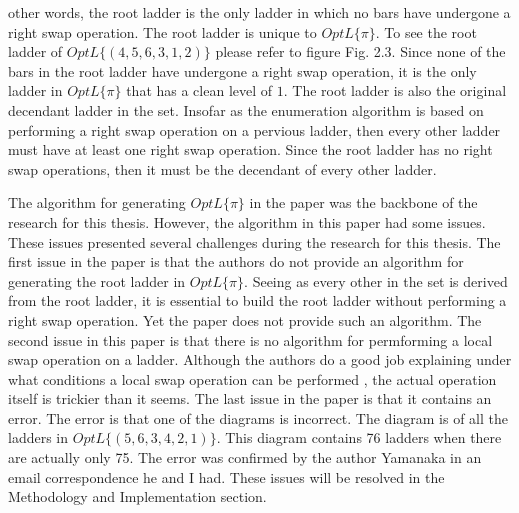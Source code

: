 other words, the root ladder is the only ladder in which no bars have undergone 
a right swap operation. The root ladder is unique to $OptL\{\pi\}$. To see the root ladder 
of $OptL\{(4,5,6,3,1,2)\}$ please refer to figure Fig. 2.3. Since none of
the bars in the root ladder have undergone a right swap operation, it is the only 
ladder in $OptL\{\pi\}$ that has a clean level of $1$. The root ladder is
also the original decendant ladder in the set. Insofar as the enumeration algorithm 
is based on performing a right swap operation on a pervious ladder, then every other 
ladder must have at least one right swap operation. Since the root ladder has
no right swap operations, then it must be the decendant of every other ladder.\par 
The algorithm for generating $OptL\{\pi\}$ in the paper was the backbone 
of the research for this thesis. However, the algorithm in this paper had some 
issues. These issues presented several challenges during the research for this thesis.
The first issue in the paper is that the authors do not provide an algorithm for
generating the root ladder in $OptL\{\pi\}$. Seeing as every other in the set 
is derived from the root ladder, it is essential to build the root ladder without
performing a right swap operation. Yet the paper does not provide such an 
algorithm. The second issue in this paper is that there is no algorithm 
for permforming a local swap operation on a ladder. Although the authors 
do a good job explaining under what conditions a local swap operation can 
be performed \cite{A1}, the actual operation itself is trickier than it seems. The last 
issue in the paper is that it contains an error. The error is that one of the diagrams is incorrect. 
The diagram is of all the ladders in $OptL\{(5,6,3,4,2,1)\}$. This diagram contains 76 
ladders when there are actually only 75. The error was confirmed by the author Yamanaka in an 
email correspondence he and I had. These issues will be resolved in the Methodology and Implementation
section.

